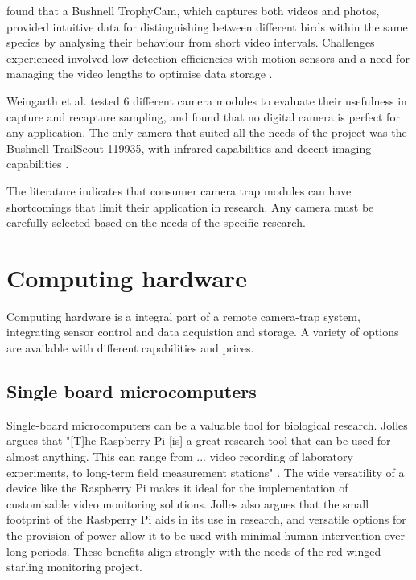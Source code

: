 \documentclass[class=report,11pt,crop=false]{standalone}
\begin{document}
\cite{ribeiro-silva2018testing} found that a Bushnell TrophyCam, which captures both videos and photos, provided intuitive data for distinguishing between different birds within the same species by analysing their behaviour from short video intervals. Challenges experienced involved low detection efficiencies with motion sensors and a need for managing the video lengths to optimise data storage \cite{ribeiro-silva2018testing}. 

Weingarth et al. \cite{weingarth2013evaluation} tested 6 different camera modules to evaluate their usefulness in capture and recapture sampling, and found that no digital camera is perfect for any application. The only camera that suited all the needs of the project was the Bushnell TrailScout 119935, with infrared capabilities and decent imaging capabilities \cite{weingarth2013evaluation}. 

The literature indicates that consumer camera trap modules can have shortcomings that limit their application in research. Any camera must be carefully selected based on the needs of the specific research.

\section{Computing hardware}

Computing hardware is a integral part of a remote camera-trap system, integrating sensor control and data acquistion and storage. A variety of options are available with different capabilities and prices.

\subsection{Single board microcomputers}

Single-board microcomputers can be a valuable tool for biological research. Jolles argues that "[T]he Raspberry Pi [is] a great research tool that can be used for almost anything. This can range from ... video recording of laboratory experiments, to long-term field measurement stations" \cite{jolles2021broad-scale}. The wide versatility of a device like the Raspberry Pi makes it ideal for the implementation of customisable video monitoring solutions. Jolles \cite{jolles2021broad-scale} also argues that the small footprint of the Rasbperry Pi aids in its use in research, and versatile options for the provision of power allow it to be used with minimal human intervention over long periods. These benefits align strongly with the needs of the red-winged starling monitoring project.
\end{document}
